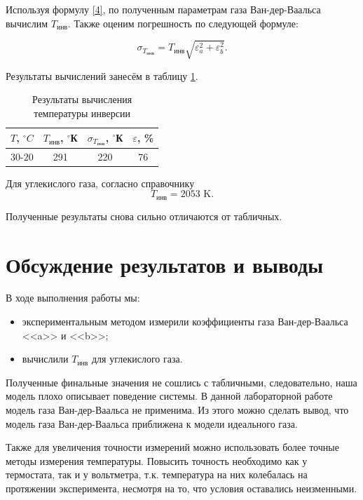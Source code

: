 \documentclass[a4paper,12pt]{article} %
\begin{document}
Используя формулу \eqref{4}, по полученным параметрам газа Ван-дер-Ваальса вычислим $ T_\text{инв} $. Также оценим погрешность по следующей формуле:

\[ \sigma_{T_\text{инв}} = T_\text{инв}\sqrt{\varepsilon^2_a+\varepsilon_b^2}. \]

Результаты вычислений занесём в таблицу \ref{tab:temp}.

\begin{table}[H]
	\centering
	\begin{tabular}{|c|c|c|c|}
		\hline
		$ T $, $ ^\circ C $ & $ T_\text{инв} $, $ ^\circ $К & $ \sigma_{T_\text{инв}} $, $ ^\circ $К & $ \varepsilon $, \% \\ \hline
		30-20 & 291 & 220 & 76 \\ \hline
	\end{tabular}
	\caption{Результаты вычисления температуры инверсии}
	\label{tab:temp}
\end{table}

Для углекислого газа, согласно справочнику  \[ T_\text{инв} = 2053 \text{ K}.\]

Полученные результаты снова сильно отличаются от табличных.

\section{Обсуждение результатов и выводы}

В ходе выполнения работы мы:

\begin{itemize}
	\item экспериментальным методом измерили коэффициенты газа Ван-дер-Ваальса <<a>> и <<b>>;
	\item вычислили $ T_\text{инв} $ для углекислого газа.
\end{itemize}

Полученные финальные значения не сошлись с табличными, следовательно, наша модель плохо описывает поведение системы. В данной лабораторной работе модель газа Ван-дер-Ваальса не применима. Из этого можно сделать вывод, что модель газа Ван-дер-Ваальса приближена к модели идеального газа.

Также для увеличения точности измерений можно использовать более точные методы измерения температуры. Повысить точность необходимо как у термостата, так и у вольтметра, т.к. температура на них колебалась на протяжении эксперимента, несмотря на то, что условия оставались неизменными.
\end{document}
